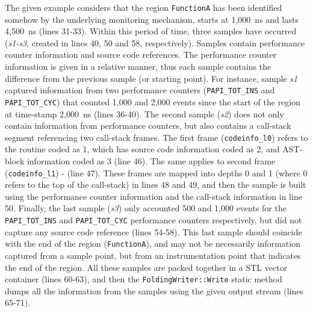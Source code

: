 The given example considers that the region \texttt{FunctionA} has been identified somehow by the underlying monitoring mechanism, starts at 1,000~ns and lasts 4,500~ns (lines 31-33).
Within this period of time, three samples have occurred (\textit{s1-s3}, created in lines 40, 50 and 58, respectively).
Samples contain performance counter information and source code references.
The performance counter information is given in a relative manner, thus each sample contains the difference from the previous sample (or starting point).
For instance, sample \textit{s1} captured information from two performance counters (\texttt{PAPI\_TOT\_INS} and \texttt{PAPI\_TOT\_CYC}) that counted 1,000 and 2,000 events since the start of the region at time-stamp 2,000~ns (lines 36-40).
The second sample (\textit{s2}) does not only contain information from performance counters, but also contains a call-stack segment referencing two call-stack frames.
The first frame (\texttt{codeinfo\_l0}) refers to the routine coded as 1, which has source code information coded as 2, and AST-block information coded as 3 (line 46).
The same applies to second frame (\texttt{codeinfo\_l1}) - (line 47).
These frames are mapped into depths 0 and 1 (where 0 refers to the top of the call-stack) in lines 48 and 49, and then the sample is built using the performance counter information and the call-stack information in line 50.
Finally, the last sample (\textit{s3}) only accounted 500 and 1,000 events for the \texttt{PAPI\_TOT\_INS} and \texttt{PAPI\_TOT\_CYC} performance counters respectively, but did not capture any source code reference (lines 54-58).
This last sample should coincide with the end of the region (\texttt{FunctionA}), and may not be necessarily information captured from a sample point, but from an instrumentation point that indicates the end of the region.
All these samples are packed together in a STL vector container (lines 60-63), and then the \texttt{FoldingWriter::Write} static method dumps all the information from the samples using the given output stream (lines 65-71).

